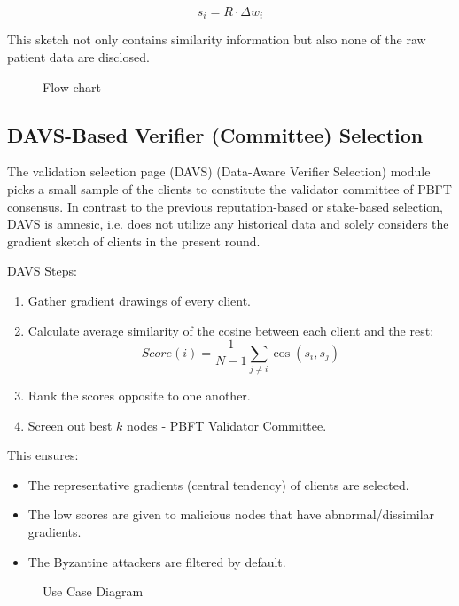 \documentclass[12pt,a4paper]{article}
\begin{document}
\begin{equation}
    s_i = R \cdot \Delta w_i
\end{equation}

This sketch not only contains similarity information but also none of the raw patient data are disclosed.

\begin{figure}[h]
    \centering
    \fbox{\rule{0pt}{2in} \rule{0.9\linewidth}{0pt}}
    \caption{Flow chart}
\end{figure}

\subsection{DAVS-Based Verifier (Committee) Selection}
The validation selection page (DAVS) (Data-Aware Verifier Selection) module picks a small sample of the clients to constitute the validator committee of PBFT consensus. In contrast to the previous reputation-based or stake-based selection, DAVS is amnesic, i.e. does not utilize any historical data and solely considers the gradient sketch of clients in the present round.

DAVS Steps:
\begin{enumerate}
    \item Gather gradient drawings of every client.
    \item Calculate average similarity of the cosine between each client and the rest:
    \begin{equation}
        Score(i) = \frac{1}{N-1} \sum_{j \neq i} \cos(s_i, s_j)
    \end{equation}
    \item Rank the scores opposite to one another.
    \item Screen out best $k$ nodes - PBFT Validator Committee.
\end{enumerate}

This ensures:
\begin{itemize}
    \item The representative gradients (central tendency) of clients are selected.
    \item The low scores are given to malicious nodes that have abnormal/dissimilar gradients.
    \item The Byzantine attackers are filtered by default.
\end{itemize}

\begin{figure}[h]
    \centering
    \fbox{\rule{0pt}{2in} \rule{0.9\linewidth}{0pt}}
    \caption{Use Case Diagram}
\end{figure}
\end{document}
